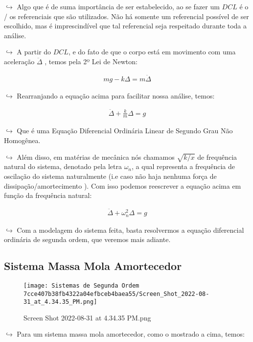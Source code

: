 \documentclass{article}
\begin{document}
\begin{itemize}
\(\hookrightarrow\) Algo que é de suma importância de ser estabelecido,
ao se fazer um \(DCL\) é o / os referenciais que são utilizados. Não há
somente um referencial possível de ser escolhido, mas é imprescindível
que tal referencial seja respeitado durante toda a análise.

\(\hookrightarrow\) A partir do \(DCL\), e do fato de que o corpo está
em movimento com uma aceleração \(\ddot\Delta\) , temos pela 2º Lei de
Newton:

\[
\begin{align}
mg - k\Delta = m\ddot\Delta
\end{align}
\]

\(\hookrightarrow\) Rearranjando a equação acima para facilitar nossa
análise, temos:

\[
\begin{align}
\ddot\Delta + \frac{k}{m}\Delta = g
\end{align}
\]

\(\hookrightarrow\) Que é uma Equação Diferencial Ordinária Linear de
Segundo Grau Não Homogênea.

\(\hookrightarrow\) Além disso, em matérias de mecânica nós chamamos
\(\sqrt{k/x}\) de frequência natural do sistema, denotado pela letra
\(\omega_n\), a qual representa a frequência de oscilação do sistema
naturalmente (i.e caso não haja nenhuma força de
dissipação/amortecimento ). Com isso podemos reescrever a equação acima
em função da frequência natural:

\[
\begin{align}
\ddot \Delta  + \omega_n^2 \Delta = g
\end{align}
\]

\(\hookrightarrow\) Com a modelagem do sistema feita, basta resolvermos
a equação diferencial ordinária de segunda ordem, que veremos mais
adiante.

\hypertarget{sistema-massa-mola-amortecedor}{%
\subsection{Sistema Massa Mola
Amortecedor}\label{sistema-massa-mola-amortecedor}}

\begin{figure}
\centering
\texttt{[image: Sistemas de Segunda Ordem 7cce407b38fb4322a04efbceb4baea55/Screen\_Shot\_2022-08-31\_at\_4.34.35\_PM.png]}
\caption{Screen Shot 2022-08-31 at 4.34.35 PM.png}
\end{figure}

\(\hookrightarrow\) Para um sistema massa mola amortecedor, como o
mostrado a cima, temos:


\end{itemize}
\end{document}
